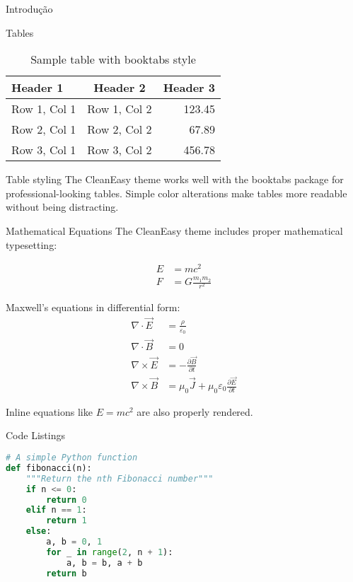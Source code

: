 \begin{frame}{Introdução}
\begin{frame}
\begin{frame}{Tables}
  \begin{table}
    \centering
    \caption{Sample table with booktabs style}
    \begin{tabular}{lcr}
      \toprule
      \textbf{Header 1} & \textbf{Header 2} & \textbf{Header 3} \\
      \midrule
      Row 1, Col 1 & Row 1, Col 2 & 123.45 \\
      Row 2, Col 1 & Row 2, Col 2 & 67.89 \\
      Row 3, Col 1 & Row 3, Col 2 & 456.78 \\
      \bottomrule
    \end{tabular}
  \end{table}
  
  \vspace{0.5cm}
  
  \begin{block}{Table styling}
    The CleanEasy theme works well with the booktabs package for professional-looking tables. 
    Simple color alterations make tables more readable without being distracting.
  \end{block}
\end{frame}

\begin{frame}{Mathematical Equations}
  The CleanEasy theme includes proper mathematical typesetting:
  
  \begin{align}
    E &= mc^2 \\
    F &= G\frac{m_1 m_2}{r^2}
  \end{align}
  
  Maxwell's equations in differential form:
  \begin{align}
    \nabla \cdot \vec{E} &= \frac{\rho}{\varepsilon_0} \\
    \nabla \cdot \vec{B} &= 0 \\
    \nabla \times \vec{E} &= -\frac{\partial \vec{B}}{\partial t} \\
    \nabla \times \vec{B} &= \mu_0 \vec{J} + \mu_0\varepsilon_0\frac{\partial \vec{E}}{\partial t}
  \end{align}
  
  Inline equations like $E = mc^2$ are also properly rendered.
\end{frame}

\begin{frame}[fragile]{Code Listings}
  \begin{lstlisting}[language=Python]
# A simple Python function
def fibonacci(n):
    """Return the nth Fibonacci number"""
    if n <= 0:
        return 0
    elif n == 1:
        return 1
    else:
        a, b = 0, 1
        for _ in range(2, n + 1):
            a, b = b, a + b
        return b
  

\end{lstlisting}
\end{frame}
\end{frame}
\end{frame}
